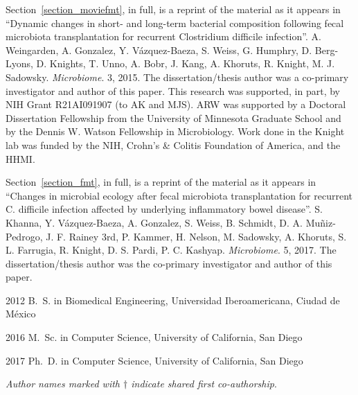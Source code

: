 \begin{frontmatter}
\begin{acknowledgements}
    Section~\ref{section_moviefmt}, in full, is a reprint of the material as it 
    appears in ``Dynamic changes in short- and long-term bacterial composition 
    following fecal microbiota transplantation for recurrent Clostridium 
    difficile infection''.  A. Weingarden, A. Gonzalez, Y.  V\'azquez-Baeza, S.  
    Weiss, G.  Humphry, D. Berg-Lyons, D. Knights, T.  Unno, A. Bobr, J.  Kang, 
    A. Khoruts, R. Knight, M. J. Sadowsky. \emph{Microbiome}. 3, 2015.  The 
    dissertation/thesis author was a co-primary investigator and author of this 
    paper. This research was supported, in part, by NIH Grant R21AI091907 (to 
    AK and MJS). ARW was supported by a Doctoral Dissertation Fellowship from 
    the University of Minnesota Graduate School and by the Dennis W.  Watson 
    Fellowship in Microbiology. Work done in the Knight lab was funded by the 
    NIH, Crohn's \& Colitis Foundation of America, and the HHMI.  

    Section~\ref{section_fmt}, in full, is a reprint of the material as it 
    appears in ``Changes in microbial ecology after fecal microbiota 
    transplantation for recurrent C. difficile infection affected by underlying 
    inflammatory bowel disease''. S. Khanna, Y.  V\'azquez-Baeza, A.  Gonzalez, 
    S. Weiss, B.  Schmidt, D. A.  Muñiz-Pedrogo, J. F. Rainey 3rd, P. Kammer, 
    H. Nelson, M.  Sadowsky, A.  Khoruts, S. L. Farrugia, R. Knight, D. S.  
    Pardi, P. C.  Kashyap. \emph{Microbiome}. 5, 2017. The dissertation/thesis 
    author was the co-primary investigator and author of this paper.

\end{acknowledgements}


%
%
\begin{vitapage}
\begin{vita}
  \item[2012] B.~S. in Biomedical Engineering, Universidad Iberoamericana, Ciudad de M\'exico
  \item[2016] M.~Sc. in Computer Science, University of California, San Diego
  \item[2017] Ph.~D. in Computer Science, University of California, San Diego 
\end{vita}


\begin{publications}

    \item \textsl{Author names marked with $\dagger$ indicate shared first co-authorship}.


\end{publications}
\end{vitapage}
\end{frontmatter}
